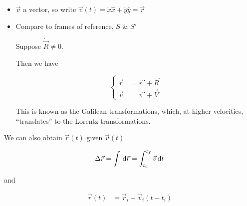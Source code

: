 \begin{itemize}
	\item $\vec v$ a vector, so write $\vec v(t) = \dot x \hat x + \dot y \hat y = \dot{\vec{r}}$
	\item Compare to frames of reference, $S$ \& $S'$
	
	Suppose $\dot{\vec{R}} \neq 0$.

	Then we have

	\begin{equation}
		\begin{cases}
			\vec r &= \vec r' + \vec R\\
			\vec v &= \vec v' + \vec V
		\end{cases}
	\end{equation}

	This is known as the Galilean transformations, which, at higher velocities, ``translates'' to the Lorentz transformations.
\end{itemize}

We can also obtain $\vec r(t)$ given $\vec v(t)$

\begin{equation}
	\Delta \vec r = \int \D \vec r = \int_{t_i}^{t_f} \vec v \D t
\end{equation}

and

\begin{align}
	\vec r(t) &= \vec r_i + \vec v_i (t - t_i)
\end{align}